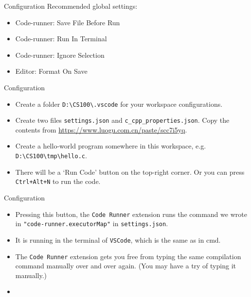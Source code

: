 \documentclass[handout]{beamer}
\begin{document}
\begin{frame}{Configuration}
    Recommended global settings:
    \begin{itemize}
        \item Code-runner: Save File Before Run\quad{}
        \item Code-runner: Run In Terminal\quad{}
        \item Code-runner: Ignore Selection\quad{}
        \item Editor: Format On Save\quad{}
    \end{itemize}
\end{frame}

\begin{frame}{Configuration}
    \begin{itemize}
        \item Create a folder \texttt{D:\textbackslash CS100\textbackslash .vscode} for your workspace configurations.
        \item Create two files \texttt{settings.json} and \texttt{c\_cpp\_properties.json}. Copy the contents from \url{https://www.luogu.com.cn/paste/scc7i5yq}.
        \pause
        \item Create a hello-world program somewhere in this workspace, e.g. \texttt{D:\textbackslash CS100\textbackslash tmp\textbackslash hello.c}.
        \item There will be a `Run Code' button on the top-right corner. Or you can press \texttt{Ctrl+Alt+N} to run the code.
    \end{itemize}
\end{frame}

\begin{frame}{Configuration}
    \begin{itemize}
        \item Pressing this button, the \texttt{Code Runner} extension runs the command we wrote in \texttt{"code-runner.executorMap"} in \texttt{settings.json}.
        \item It is running in the terminal of \texttt{VSCode}, which is the same as in cmd.
        \item The \texttt{Code Runner} extension gets you free from typing the same compilation command manually over and over again. (You may have a try of typing it manually.)
        \item {}
    \end{itemize}
\end{frame}
\end{document}
